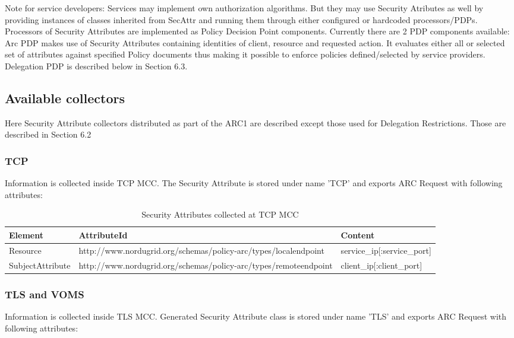 \documentclass{article}                            %
\begin{document}
Note for service developers: Services may implement own authorization algorithms. But they may use Security Atributes as well by providing instances of classes inherited from SecAttr and running them through either configured or hardcoded processors/PDPs.
Processors of Security Attributes are implemented as Policy Decision Point components. Currently there are 2 PDP components available:
Arc PDP makes use of Security Attributes containing identities of client, resource and requested action. It evaluates either all or selected set of attributes against specified Policy documents thus making it possible to enforce policies defined/selected by service providers.
Delegation PDP is described below in Section 6.3.


\subsection{Available collectors} %
\label{subsec:sec_attr_avail_collectors}

Here Security Attribute collectors distributed as part of the ARC1 are described except those used for Delegation Restrictions. Those are described in Section 6.2

\subsubsection{TCP} %
\label{subsubsec:sec_attr_TCP}
Information is collected inside TCP MCC. The Security Attribute is stored under name 'TCP' and exports ARC Request with following attributes:

\begin{table}[ht]
\caption{Security Attributes collected at TCP MCC}
\centering
\begin{tabular}{| l | p{7cm} | p{5cm} |}
\hline
\textbf{Element} & \textbf{AttributeId} & \textbf{Content} \\ \hline
Resource & http://www.nordugrid.org/schemas/policy-arc/types/localendpoint & service\_ip[:service\_port] \\ \hline
SubjectAttribute & http://www.nordugrid.org/schemas/policy-arc/types/remoteendpoint & client\_ip[:client\_port] \\ \hline
\end{tabular}
\label{table:tcp_attr}
\end{table}


\subsubsection{TLS and VOMS} %
\label{subsubsec:sec_attr_TLS_VOMS}
Information is collected inside TLS MCC. Generated Security Attribute class is stored under name 'TLS' and exports ARC Request with following attributes:
\end{document}
